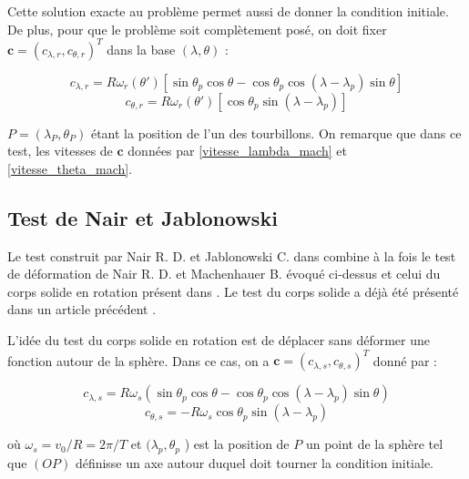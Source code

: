 Cette solution exacte au problème permet aussi de donner la condition initiale. De plus, pour que le problème soit complètement posé, on doit fixer $\mathbf{c} = ( c_{\lambda, r} , c_{\theta, r})^T$ dans la base $(\lambda, \theta)$ : 


\begin{equation}
c_{\lambda, r} = R \omega_r ( \theta' ) \left[ \sin \theta_p \cos \theta - \cos \theta_p \cos ( \lambda - \lambda_p ) \sin \theta \right]
\label{vitesse_lambda_mach}
\end{equation}
\begin{equation}
c_{\theta, r} = R \omega_r ( \theta' ) \left[ \cos \theta_p \sin ( \lambda - \lambda_p ) \right]
\label{vitesse_theta_mach}
\end{equation}

$P = ( \lambda_P, \theta_P)$ étant la position de l'un des tourbillons. On remarque que dans ce test, les vitesses de $\mathbf{c}$ données par \eqref{vitesse_lambda_mach} et \eqref{vitesse_theta_mach}.

\subsection{Test de Nair et Jablonowski}

Le test construit par Nair R. D. et Jablonowski C. dans \cite{Nair2008} combine à la fois le test de déformation de Nair R. D. et Machenhauer B. \cite{Nair2001} évoqué ci-dessus et celui du corps solide en rotation présent dans \cite{Williamson1994}. Le test du corps solide a déjà été présenté dans un article précédent \cite{Croisille2013}. 

L'idée du test du corps solide en rotation est de déplacer sans déformer une fonction autour de la sphère. Dans ce cas, on a $\mathbf{c} = \left( c_{\lambda, s}, c_{\theta, s} \right)^T$ donné par :

\begin{equation}
c_{\lambda, s} = R \omega_s \left( \sin \theta_p \cos \theta - \cos \theta_p \cos ( \lambda - \lambda_p ) \sin \theta \right)
\label{vitesse_lambda_bump}
\end{equation}
\begin{equation}
c_{\theta, s} = - R \omega_s \cos \theta_p \sin ( \lambda - \lambda_p )
\label{vitesse_theta_bump}
\end{equation}

où $\omega_s = v_0 / R = 2 \pi / T $ et $( \lambda_p, \theta_p$ )  est la position de $P$ un point de la sphère tel que $(OP)$ définisse un axe autour duquel doit tourner la condition initiale.

